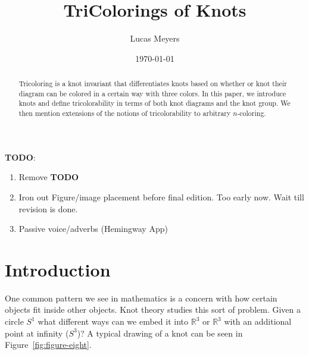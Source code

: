 \documentclass[12pt]{amsart}
\theoremstyle{definition}
\theoremstyle{remark}
\numberwithin{equation}{section}
\newcommand{\bb}[1]{\mathbb{#1}}
\begin{document}
\title{TriColorings of Knots}


\author{Lucas Meyers}
\address{Mathematics Department\\
Louisiana State University\\
Baton Rouge, Louisiana}

\date{\today}

\begin{abstract}
  Tricoloring is a knot invariant that differentiates knots
  based on whether or knot their diagram can be colored in a
  certain way with three colors. In this paper, we introduce knots
  and define tricolorability in terms of both knot diagrams
  and the knot group. We then mention extensions of the notions
  of tricolorability to arbitrary $n$-coloring.
\end{abstract}

\maketitle
\textbf{TODO}:
\begin{enumerate}
\item Remove \textbf{TODO}
\item Iron out Figure/image placement before final edition. Too early
  now. Wait till revision is done.
\item Passive voice/adverbs (Hemingway App)
\end{enumerate}

\section{Introduction}
\label{introduction}

One common pattern we see in mathematics is a concern with how
certain objects fit inside other objects. Knot theory studies this
sort of problem. Given a circle $S^1$ what different ways can we embed
it into $\bb{R}^3$ or $\bb{R}^3$  with an additional point at infinity ($S^3$)?
A typical drawing of a knot can be seen in Figure~\ref{fig:figure-eight}.
\end{document}
